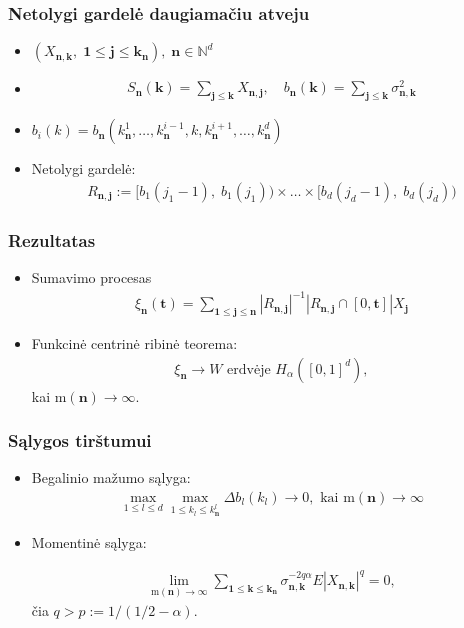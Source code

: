 \documentclass[utf8,hyperref={unicode}]{beamer}
\newcommand{\ab}[1]{#1_{\alpha}}
\theoremstyle{change}\newtheorem{teorema}{Teiginys}
\theoremstyle{change}\newtheorem{salyga}{}
\newcommand{\n}{{\bm{n}}}
\newcommand{\one}{{\bm{1}}}
\newcommand{\nj}{{\bm{n},\bm{j}}}
\newcommand{\nk}{{\bm{n},\bm{k}}}
\newcommand{\kn}{\bm{k}_{\bm{n}}}
\newcommand{\snk}{\sigma^2_{\bm{n},\bm{k}}}
\newcommand{\Rnj}{R_{\bm{n},\bm{j}}}
\newcommand{\m}{\mathrm{m}}
\begin{document}
\begin{frame}
    \frametitle{Netolygi gardelė daugiamačiu atveju} 
    \begin{itemize}
	\item $(X_{\bm{n},\bm{k}},\; \bm{1}\le \bm{j}\le \bm{k}_{\bm{n}}),\; \bm{n}\in
    \mathbb{N}^d$
\item 
    \begin{align*}
    S_\n(\bm{k})=\sum_{\bm{j}\le \bm{k}}X_\nj,\quad b_\n(\bm{k})=\sum_{\bm{j}\le
    \bm{k}}\snk
\end{align*}

	\item $ b_i(k)=b_\n(k^1_\n,\dots,k^{i-1}_\n,k,k^{i+1}_\n,\dots,k^d_\n)$
	\item Netolygi gardelė: 
	    \begin{align*}
    \Rnj :=\bigg[b_1(j_1-1),\; b_1(j_1)\bigg)\times \dots\times
    \bigg[b_d(j_d-1),\;b_d(j_d)\bigg)
\end{align*}
	 
    \end{itemize}
\end{frame}
\begin{frame}
    \frametitle{Rezultatas} 
    \begin{itemize}
	\item Sumavimo procesas
   \begin{align*}
		\xi_{\bm{n}}(\bm{t})=\sum_{\bm{1}\le \bm{j}\le
		\bm{n}}|R_{\bm{n},\bm{j}}|^{-1}|R_{\bm{n},\bm{j}}\cap
		[0,\bm{t}]|X_{\bm{j}}	
    \end{align*}
	\item Funkcinė centrinė ribinė teorema:
	    \begin{align*}
		\xi_\n\to W \text{ erdvėje } \ab{H}([0,1]^d),
	    \end{align*}
	    kai $\m(\bm{n})\to\infty$.
    \end{itemize}
 \end{frame}

\begin{frame}
    \frametitle{Sąlygos tirštumui} 
    \begin{itemize}
	\item Begalinio mažumo sąlyga:
	   \begin{align*}
		\max_{1\le l\le d}\max_{1\le k_l\le k^l_\n}\Delta b_l(k_l) \to 0,
	    \text{ kai } \m(\bm{n})\to \infty
	\end{align*}
    \item Momentinė sąlyga:
	
	\begin{align*}
    \lim_{\m(\n)\to\infty}
    \sum_{\one\le \bm{k}\le\kn}\sigma_{\nk}^{-2q\alpha}E|X_\nk|^q=0,
\end{align*}
    čia $q>p:=1/(1/2-\alpha)$.
    \end{itemize}
 
\end{frame}
\end{document}
